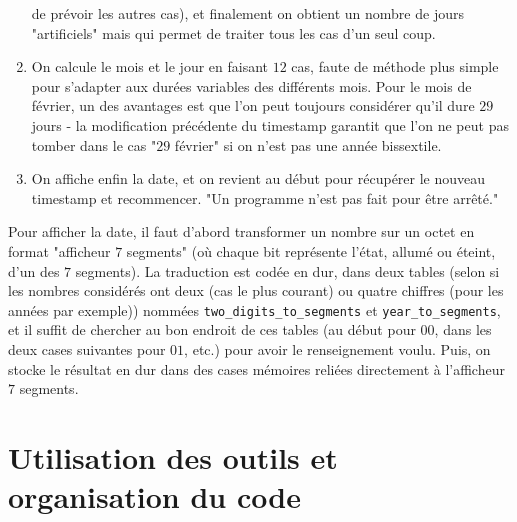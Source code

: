 \documentclass[13pt]{article}
\begin{document}
\begin{enumerate}
   de prévoir les autres cas), et finalement on obtient un nombre de jours
   "artificiels" mais qui permet de traiter tous les cas d'un seul coup.
\item On calcule le mois et le jour en faisant $12$ cas, faute de méthode plus simple
   pour s'adapter aux durées variables des différents mois. Pour le mois de
   février, un des avantages est que l'on peut toujours considérer qu'il dure $29$
   jours - la modification précédente du timestamp garantit que l'on ne peut pas
   tomber dans le cas "$29$ février" si on n'est pas une année bissextile.
\item On affiche enfin la date, et on revient au début pour récupérer le nouveau
   timestamp et recommencer. "Un programme n'est pas fait pour être arrêté."
\end{enumerate}

Pour afficher la date, il faut d'abord transformer un nombre sur un octet en
format "afficheur $7$ segments" (où chaque bit représente l'état, allumé ou
éteint, d'un des $7$ segments). La traduction est codée en dur, dans deux tables
(selon si les nombres considérés ont deux (cas le plus courant) ou quatre
chiffres (pour les années par exemple)) nommées \texttt{two\_digits\_to\_segments} et
\texttt{year\_to\_segments}, et il suffit de chercher au bon endroit de ces tables (au
début pour $00$, dans les deux cases suivantes pour $01$, etc.) pour avoir
le renseignement voulu. Puis, on stocke le résultat en dur dans des cases
mémoires reliées directement à l'afficheur $7$ segments.


\section{Utilisation des outils et organisation du code}
\end{document}
